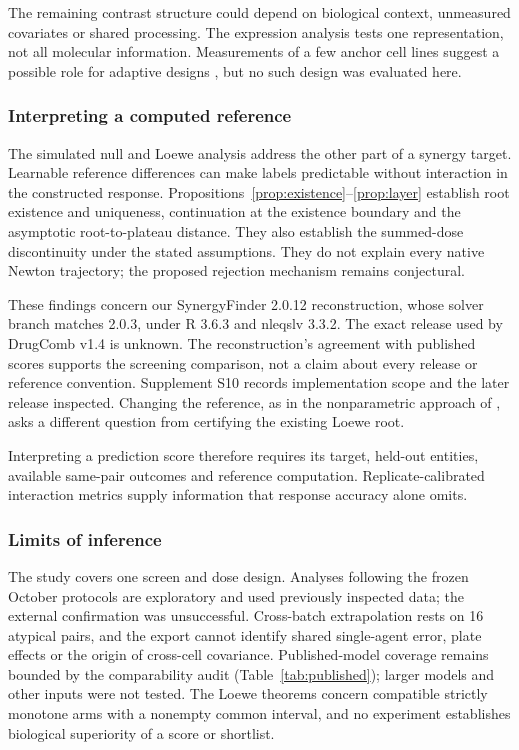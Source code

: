 \documentclass[11pt]{article}
\begin{document}
The remaining contrast structure could depend on biological context, unmeasured covariates or shared processing. The expression analysis tests one representation, not all molecular information. Measurements of a few anchor cell lines suggest a possible role for adaptive designs \citep{tosh2025,wang2025}, but no such design was evaluated here.

\subsubsection*{Interpreting a computed reference}
The simulated null and Loewe analysis address the other part of a synergy target. Learnable reference differences can make labels predictable without interaction in the constructed response. Propositions~\ref{prop:existence}–\ref{prop:layer} establish root existence and uniqueness, continuation at the existence boundary and the asymptotic root-to-plateau distance. They also establish the summed-dose discontinuity under the stated assumptions. They do not explain every native Newton trajectory; the proposed rejection mechanism remains conjectural.

These findings concern our SynergyFinder 2.0.12 reconstruction, whose solver branch matches 2.0.3, under R 3.6.3 and nleqslv 3.3.2. The exact release used by DrugComb v1.4 is unknown. The reconstruction's agreement with published scores supports the screening comparison, not a claim about every release or reference convention. Supplement S10 records implementation scope and the later release inspected. Changing the reference, as in the nonparametric approach of \citet{asiaee2026}, asks a different question from certifying the existing Loewe root.

Interpreting a prediction score therefore requires its target, held-out entities, available same-pair outcomes and reference computation. Replicate-calibrated interaction metrics supply information that response accuracy alone omits.

\subsubsection*{Limits of inference}
The study covers one screen and dose design. Analyses following the frozen October protocols are exploratory and used previously inspected data; the external confirmation was unsuccessful. Cross-batch extrapolation rests on 16 atypical pairs, and the export cannot identify shared single-agent error, plate effects or the origin of cross-cell covariance. Published-model coverage remains bounded by the comparability audit (Table~\ref{tab:published}); larger models and other inputs were not tested. The Loewe theorems concern compatible strictly monotone arms with a nonempty common interval, and no experiment establishes biological superiority of a score or shortlist.
\end{document}
